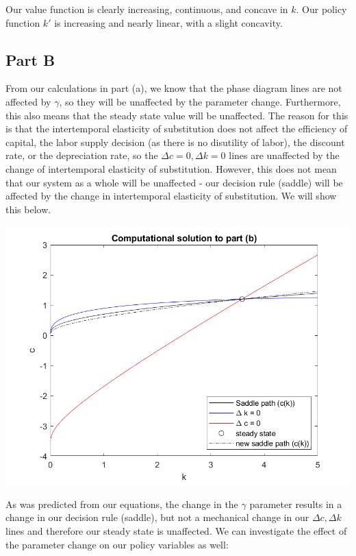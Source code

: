 \documentclass[11pt]{article} %
\begin{document}
Our value function is clearly increasing, continuous, and concave in $k$. Our policy function $k'$ is increasing and nearly linear, with a slight concavity.

\subsection{Part B}

From our calculations in part (a), we know that the phase diagram lines are not affected by $\gamma$, so they will be unaffected by the parameter change. Furthermore, this also means that the steady state value will be unaffected. The reason for this is that the intertemporal elasticity of substitution does not affect the efficiency of capital, the labor supply decision (as there is no disutility of labor), the discount rate, or the depreciation rate, so the $\Delta c = 0,\Delta k = 0$ lines are unaffected by the change of intertemporal elasticity of substitution. However, this does not mean that our system as a whole will be unaffected - our decision rule (saddle) will be affected by the change in intertemporal elasticity of substitution. We will show this below.

\includegraphics{partB}

As was predicted from our equations, the change in the $\gamma$ parameter results in a change in our decision rule (saddle), but not a mechanical change in our $\Delta c,\Delta k$ lines and therefore our steady state is unaffected. We can investigate the effect of the parameter change on our policy variables as well:
\end{document}
